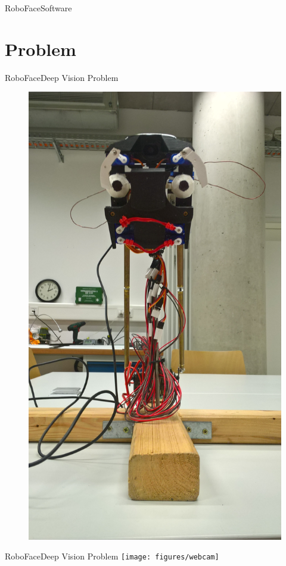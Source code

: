 \documentclass{beamer}
\begin{document}
\begin{frame}{RoboFace}{Software}
    \lstServoConstraints
\end{frame}

\section{Problem}
\begin{frame}{RoboFace}{Deep Vision Problem}
	\begin{figure}
		\centering
		\vspace*{-18mm}
		\includegraphics[width=0.8\linewidth,angle=270]{figures/roboFace}
		\label{fig:face}
	\end{figure}
\end{frame}

\begin{frame}{RoboFace}{Deep Vision Problem}
		\vspace*{-11.6mm}
		\hspace*{2.85cm}
		\texttt{[image: figures/webcam]}
\end{frame}
\end{document}
